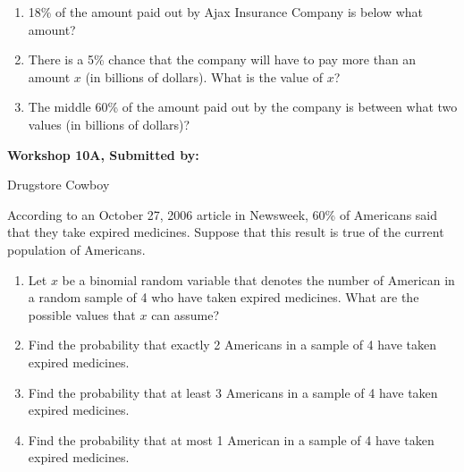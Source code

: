 \documentclass[11pt, chapterprefix=true]{scrbook}\usepackage[]{graphicx}\usepackage[]{color}
\begin{document}
\begin{exercises}
\begin{exercise}
\begin{enumerate}
  \item 18\% of the amount paid out by Ajax Insurance Company is below what amount?
  \item There is a 5\% chance that the company will have to pay more than an amount $x$ (in billions of dollars). What is the value of $x$?
  \item The middle 60\% of the amount paid out by the company is between what two values (in billions of dollars)? 
\end{enumerate}

\end{exercise} 
\begin{solution}  %

\end{solution}

\clearpage

    \begin{exercise}  %

    \begin{center}
\begin{flushleft}\textbf{\large \hfill Workshop 10A, Submitted by: }\end{flushleft}

\end{center}

Drugstore Cowboy

According to an October 27, 2006 article in Newsweek, 60\% of Americans said that they take expired medicines. Suppose that this result is true of the current population of Americans.

\begin{enumerate}
\item Let $x$ be a binomial random variable that denotes the number of American in a random sample of 4 who have taken expired medicines. What are the possible values that $x$ can assume?
\item Find the probability that exactly 2 Americans in a sample of 4 have taken expired medicines.
\item Find the probability that at least 3 Americans in a sample of 4 have taken expired medicines.
\item Find the probability that at most 1 American in a sample of 4 have taken expired medicines.
\end{enumerate}


\end{exercise}
\end{exercises}
\end{document}
